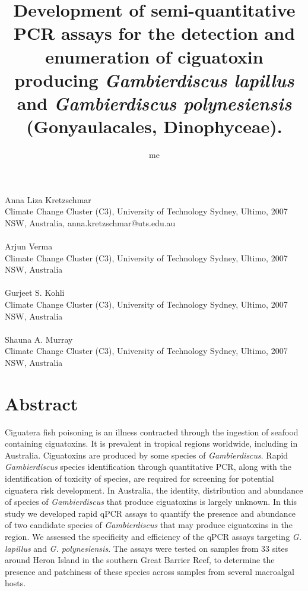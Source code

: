 \documentclass[12pt]{article}
\title{Development of semi-quantitative PCR assays for the detection and enumeration of ciguatoxin producing \emph{Gambierdiscus lapillus} and \emph{Gambierdiscus polynesiensis} (Gonyaulacales, Dinophyceae).}
\author{me}
\date{}
\begin{document}
\maketitle
\paragraph{}Anna Liza Kretzschmar\\
Climate Change Cluster (C3), University of Technology Sydney, Ultimo, 2007 NSW, Australia, anna.kretzschmar@uts.edu.au
\paragraph{}Arjun Verma \\
Climate Change Cluster (C3), University of Technology Sydney, Ultimo, 2007 NSW, Australia
\paragraph{}Gurjeet S. Kohli\\
Climate Change Cluster (C3), University of Technology Sydney, Ultimo, 2007 NSW, Australia
\paragraph{}Shauna A. Murray\\
Climate Change Cluster (C3), University of Technology Sydney, Ultimo, 2007 NSW, Australia
\newpage
\section*{Abstract}
Ciguatera fish poisoning is an illness contracted through the ingestion of seafood containing ciguatoxins. It is prevalent in tropical regions worldwide, including in Australia. Ciguatoxins are produced by some species of \emph{Gambierdiscus}. Rapid \emph{Gambierdiscus} species identification through quantitative PCR, along with the identification of toxicity of species, are required for screening for potential ciguatera risk development. In Australia, the identity, distribution and abundance of species of \textit{Gambierdiscus} that produce ciguatoxins is largely unknown. In this study we developed rapid qPCR assays to quantify the presence and abundance of two candidate species of \textit{Gambierdiscus} that may produce ciguatoxins in the region. %
We assessed the specificity and efficiency of the  qPCR assays targeting \textit{G. lapillus} and \textit{G. polynesiensis}. The assays were tested on samples from 33 sites around Heron Island in the southern Great Barrier Reef, to determine the presence and patchiness of these species across samples from several macroalgal hosts.  
\end{document}
